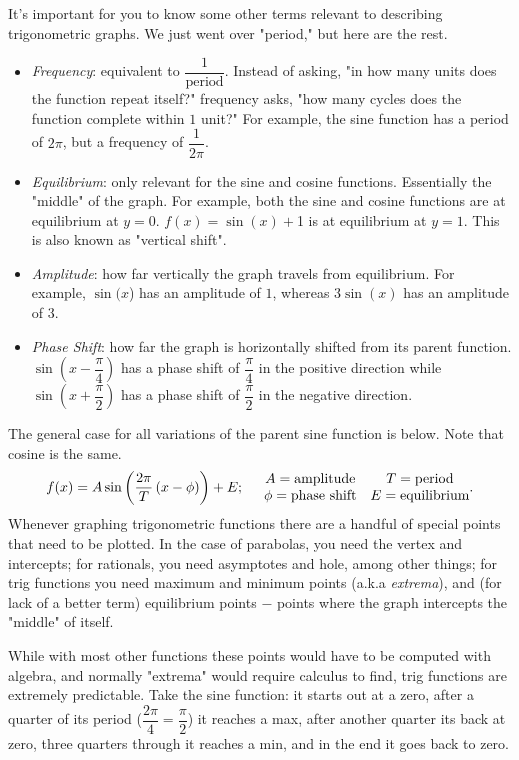 \documentclass[../book.tex]{subfiles}
\begin{document}
It's important for you to know some other terms relevant to describing trigonometric graphs. We just went over "period," but here are the rest.\begin{itemize}
    \item \textit{Frequency}: equivalent to $\dfrac{1}{\text{period}}$. Instead of asking, "in how many units does the function repeat itself?" frequency asks, "how many cycles does the function complete within $1$ unit?" For example, the sine function has a period of $2\pi$, but a frequency of $\dfrac{1}{2\pi}$.
    \item \textit{Equilibrium}: only relevant for the sine and cosine functions. Essentially the "middle" of the graph. For example, both the sine and cosine functions are at equilibrium at $y=0$. $f(x)=\sin⁡(x)+$1 is at equilibrium at $y=1$. This is also known as "vertical shift".
    \item \textit{Amplitude}: how far vertically the graph travels from equilibrium. For example, $\sin⁡(x$) has an amplitude of $1$, whereas $3\sin⁡(x)$ has an amplitude of $3$.
    \item \textit{Phase Shift}: how far the graph is horizontally shifted from its parent function.  $\sin\left(x-\dfrac{\pi}{4}\right)$ has a phase shift of $\dfrac{\pi}{4}$ in the positive direction while $\sin\left(x+\dfrac{\pi}{2}\right)$ has a phase shift of $\dfrac{\pi}{2}$ in the negative direction.
\end{itemize}
The general case for all variations of the parent sine function is below.  Note that cosine is the same. $$f(x)=A\sin\left(\dfrac{2\pi}{T}\left(x-\phi\right)\right)+E; \hspace{5mm} \begin{matrix} A=\text{amplitude} & T=\text{period} \\ \phi=\text{phase shift} & E=\text{equilibrium}\end{matrix}.$$
Whenever graphing trigonometric functions there are a handful of special points that need to be plotted. In the case of parabolas, you need the vertex and intercepts; for rationals, you need asymptotes and hole, among other things; for trig functions you need maximum and minimum points (a.k.a \textit{extrema}), and (for lack of a better term) equilibrium points $-$ points where the graph intercepts the "middle" of itself.

While with most other functions these points would have to be computed with algebra, and normally "extrema" would require calculus to find, trig functions are extremely predictable. Take the sine function: it starts out at a zero, after a quarter of its period ($\dfrac{2\pi}{4}=\dfrac{\pi}{2}$) it reaches a max, after another quarter its back at zero, three quarters through it reaches a min, and in the end it goes back to zero.
\end{document}
